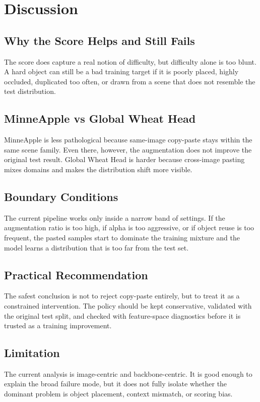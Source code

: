 \section{Discussion}

\subsection{Why the Score Helps and Still Fails}
The score does capture a real notion of difficulty, but difficulty alone is too blunt. A hard object can still be a bad training target if it is poorly placed, highly occluded, duplicated too often, or drawn from a scene that does not resemble the test distribution.

\subsection{MinneApple vs Global Wheat Head}
MinneApple is less pathological because same-image copy-paste stays within the same scene family. Even there, however, the augmentation does not improve the original test result. Global Wheat Head is harder because cross-image pasting mixes domains and makes the distribution shift more visible.

\subsection{Boundary Conditions}
The current pipeline works only inside a narrow band of settings. If the augmentation ratio is too high, if alpha is too aggressive, or if object reuse is too frequent, the pasted samples start to dominate the training mixture and the model learns a distribution that is too far from the test set.

\subsection{Practical Recommendation}
The safest conclusion is not to reject copy-paste entirely, but to treat it as a constrained intervention. The policy should be kept conservative, validated with the original test split, and checked with feature-space diagnostics before it is trusted as a training improvement.

\subsection{Limitation}
The current analysis is image-centric and backbone-centric. It is good enough to explain the broad failure mode, but it does not fully isolate whether the dominant problem is object placement, context mismatch, or scoring bias.
